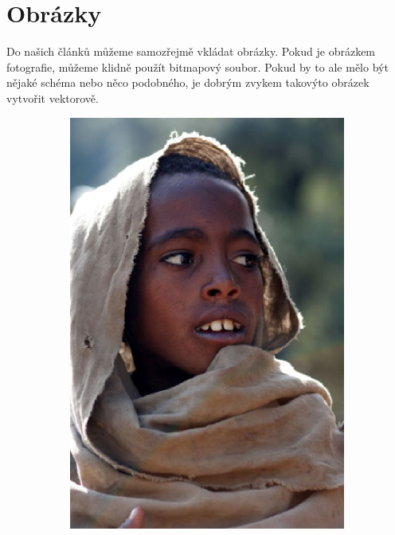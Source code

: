 \documentclass[a4paper,11pt]{article}
\begin{document}
    \section{Obrázky}
    Do našich článků můžeme samozřejmě vkládat obrázky. Pokud je obrázkem fotografie, můžeme
    klidně použít bitmapový soubor. Pokud by to ale mělo být nějaké schéma nebo něco podobného, 
    je dobrým zvykem takovýto obrázek vytvořit vektorově.
    \begin{figure}[H]
        \centering
        \begin{subfigure}[b]{0.25\textwidth}
            \centering
            \includegraphics[width=\textwidth]{etiopan.eps}
        \end{subfigure}
        \begin{subfigure}[b]{0.25\textwidth}

\end{subfigure}
\end{figure}
\end{document}
